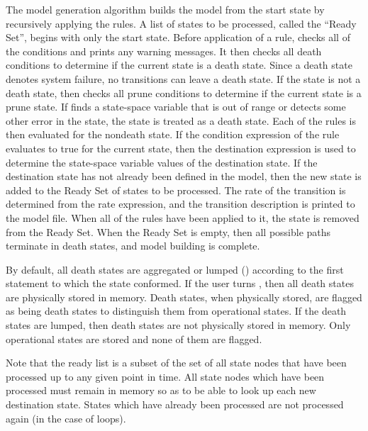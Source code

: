 \label{sec:modelgen}
The model generation algorithm builds the model
from the start state by recursively
applying the  rules.  A list of states to be processed, called
the ``Ready Set'', begins with only the start state.  Before application
of a rule,  checks all of the  conditions and
prints any warning messages.  It then checks
all death conditions to determine if the current state is a death state.
Since a death state denotes system failure, no transitions can leave a death
state.
If the state is not a death state, 
then checks all prune conditions
to determine if the current state is a prune state.
If  finds a state-space variable that is out of range
or detects some other error in the state, the state is treated as a death
state.
Each of the  rules is then evaluated for the nondeath state.
If the condition expression of the  rule evaluates to true for the 
current state, then the destination expression is used to determine
the state-space
variable values of the destination state.  If the destination state has not
already been defined in the model, then the new state is added to the Ready Set
of states to be processed.  The rate of the transition is determined from the
rate expression, and the transition description is printed to the model file.
When all of the  rules have been applied to it, the state is
removed from the Ready Set.  When the Ready Set is empty, then all possible
paths terminate in death states, and model building is complete.

By default, all death states are aggregated or lumped ()
according to the first  statement to which the state conformed.
If the user turns , then all death states are physically stored
in memory.   Death states, when physically stored, are flagged as being
death states to distinguish them from operational states.   If the death
states are lumped, then death states are not physically stored in memory.
Only operational states are stored and none of them are flagged.

Note that the ready list is a subset of the set of all state nodes that have
been processed up to any given point in time.   All state nodes which have
been processed must remain in memory so as to be able to look up each new
destination state.   States which have already been processed are not
processed again (in the case of loops).

